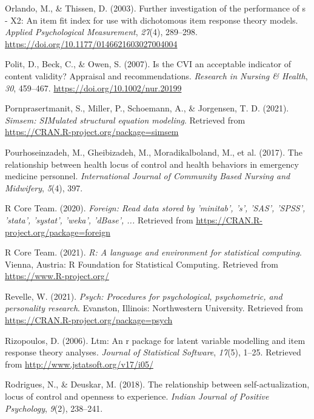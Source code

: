\documentclass[
  man]{apa6}
\newlength{\cslhangindent}
\newlength{\cslentryspacingunit} %
\newenvironment{CSLReferences}[2] %
 {%
  \setlength{\parindent}{0pt}
  \ifodd #1
  \let\oldpar\par
  \def\par{\hangindent=\cslhangindent\oldpar}
  \fi
  \setlength{\parskip}{#2\cslentryspacingunit}
 }%
 {}
\begin{document}
\begin{CSLReferences}{1}{0}
\leavevmode{}%
Orlando, M., \& Thissen, D. (2003). Further investigation of the performance of s - X2: An item fit index for use with dichotomous item response theory models. \emph{Applied Psychological Measurement}, \emph{27}(4), 289--298. \url{https://doi.org/10.1177/0146621603027004004}

\leavevmode{}%
Polit, D., Beck, C., \& Owen, S. (2007). Is the CVI an acceptable indicator of content validity? Appraisal and recommendations. \emph{Research in Nursing \& Health}, \emph{30}, 459--467. \url{https://doi.org/10.1002/nur.20199}

\leavevmode{}%
Pornprasertmanit, S., Miller, P., Schoemann, A., \& Jorgensen, T. D. (2021). \emph{Simsem: SIMulated structural equation modeling}. Retrieved from \url{https://CRAN.R-project.org/package=simsem}

\leavevmode{}%
Pourhoseinzadeh, M., Gheibizadeh, M., Moradikalboland, M., et al. (2017). The relationship between health locus of control and health behaviors in emergency medicine personnel. \emph{International Journal of Community Based Nursing and Midwifery}, \emph{5}(4), 397.

\leavevmode{}%
R Core Team. (2020). \emph{Foreign: Read data stored by 'minitab', 's', 'SAS', 'SPSS', 'stata', 'systat', 'weka', 'dBase', ...} Retrieved from \url{https://CRAN.R-project.org/package=foreign}

\leavevmode{}%
R Core Team. (2021). \emph{R: A language and environment for statistical computing}. Vienna, Austria: R Foundation for Statistical Computing. Retrieved from \url{https://www.R-project.org/}

\leavevmode{}%
Revelle, W. (2021). \emph{Psych: Procedures for psychological, psychometric, and personality research}. Evanston, Illinois: Northwestern University. Retrieved from \url{https://CRAN.R-project.org/package=psych}

\leavevmode{}%
Rizopoulos, D. (2006). Ltm: An r package for latent variable modelling and item response theory analyses. \emph{Journal of Statistical Software}, \emph{17}(5), 1--25. Retrieved from \url{http://www.jstatsoft.org/v17/i05/}

\leavevmode{}%
Rodrigues, N., \& Deuskar, M. (2018). The relationship between self-actualization, locus of control and openness to experience. \emph{Indian Journal of Positive Psychology}, \emph{9}(2), 238--241.


\end{CSLReferences}
\end{document}
